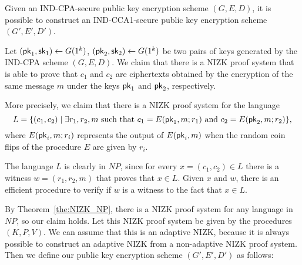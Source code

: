 \begin{theorem}
Given an IND-CPA-secure public key encryption scheme $(G,E,D)$, it is possible
to construct an IND-CCA1-secure public key encryption scheme $(G',E',D')$.
\end{theorem}
\proof
Let $(\mathsf{pk}_1,\mathsf{sk}_1)\leftarrow G(1^k)$, $(\mathsf{pk}_2,\mathsf{sk}_2)\leftarrow G(1^k)$ be two pairs
of keys generated by the IND-CPA scheme $(G,E,D)$.
We claim that there is a NIZK proof system that is
able to prove that $c_1$ and $c_2$ are ciphertexts obtained by the encryption
of the same message $m$ under the keys $\mathsf{pk}_1$ and $\mathsf{pk}_2$, respectively.

More precisely, we claim that there is a NIZK proof system for the language
$$L = \{(c_1,c_2) \mid \text{$\exists r_1,r_2,m$ such that $c_1=E(\mathsf{pk}_1,m;r_1)$ and
$c_2=E(\mathsf{pk}_2,m;r_2)$}\},$$
where $E(\mathsf{pk}_i,m;r_i)$ represents the output of $E(\mathsf{pk}_i,m)$ when the random coin flips
of the procedure $E$ are given by $r_i$.

The language $L$ is clearly in $NP$, since for every $x=(c_1,c_2)\in L$ there is a witness
$w=(r_1,r_2,m)$ that proves that $x\in L$. Given $x$ and $w$, there is an efficient procedure
to verify if $w$ is a witness to the fact that $x\in L$.

By Theorem~\ref{the:NIZK_NP}, there is a NIZK proof system for any language in $NP$, so our
claim holds.
Let this NIZK proof system be given by the procedures $(K,P,V)$.
We can assume that this is an adaptive NIZK, because it is always possible to construct an
adaptive NIZK from a non-adaptive NIZK proof system.
Then we define our public key encryption scheme $(G',E',D')$ as follows:

